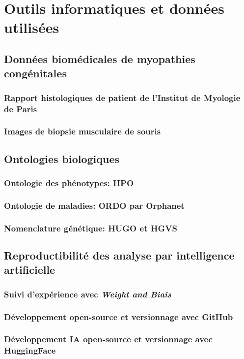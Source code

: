 \chapter{Outils informatiques et données utilisées}
\section{Données biomédicales de myopathies congénitales}
\subsection{Rapport histologiques de patient de l'Institut de Myologie de Paris}
\subsection{Images de biopsie musculaire de souris}
\section{Ontologies biologiques}
\subsection{Ontologie des phénotypes: HPO}
\subsection{Ontologie de maladies: ORDO par Orphanet}
\subsection{Nomenclature génétique: HUGO et HGVS}
\section{Reproductibilité des analyse par intelligence artificielle}
\subsection{Suivi d'expérience avec \textit{Weight and Biais}}
\subsection{Développement open-source et versionnage avec GitHub}
\subsection{Développement IA open-source et versionnage avec HuggingFace}
